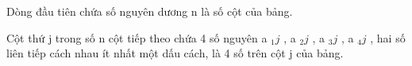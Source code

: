 Dòng đầu tiên chứa số nguyên dương n là số cột của bảng.

Cột thứ j trong số n cột tiếp theo chứa 4 số nguyên a $_ 1j $ , a $_ 2j $ , a $_ 3j $ , a $_ 4j $ , hai số liên tiếp cách nhau ít nhất một dấu cách, là 4 số trên cột j của bảng.